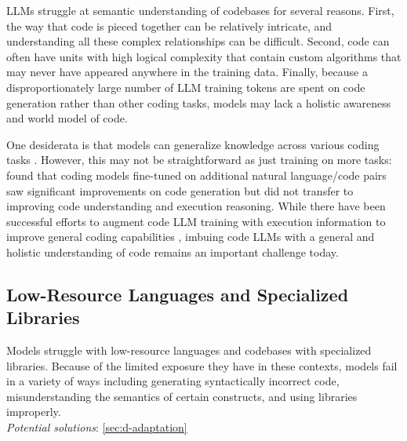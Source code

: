 LLMs struggle at semantic understanding of codebases for several reasons. First, the way that code is pieced together can be relatively intricate, and understanding all these complex relationships can be difficult. Second, code can often have units with high logical complexity that contain custom algorithms that may never have appeared anywhere in the training data. Finally, because a disproportionately large number of LLM training tokens are spent on code generation rather than other coding tasks, models may lack a holistic awareness and world model of code. 

One desiderata is that models can generalize knowledge across various coding tasks \citep{roychoudhury2025will}. However, this may not be straightforward as just training on more tasks: \citet{gu2024cruxeval} found that coding models fine-tuned on additional natural language/code pairs saw significant improvements on code generation but did not transfer to improving code understanding and execution reasoning. While there have been successful efforts to augment code LLM training with execution information to improve general coding capabilities \citep{ni2024next, ding2024traced}, imbuing code LLMs with a general and holistic understanding of code remains an important challenge today.




\subsection{Low-Resource Languages and Specialized Libraries} \label{sec:c-low-resource}

\begin{tcolorbox}[colback=lightgreen, boxrule=0pt, arc=5pt, outer arc=5pt, after skip=10pt plus 2pt]
Models struggle with low-resource languages and codebases with specialized libraries. Because of the limited exposure they have in these contexts, models fail in a variety of ways including generating syntactically incorrect code, misunderstanding the semantics of certain constructs, and using libraries improperly.
\newline \\
\textit{Potential solutions}: \ref{sec:d-adaptation}
\end{tcolorbox}

